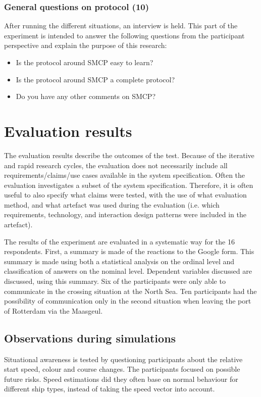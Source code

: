 \subsubsection{General questions on protocol (10)}
After running the different situations, an interview is held. This part of the experiment is intended to answer the following questions from the participant perspective and explain the purpose of this research:
\begin{spacing}{1}
	\begin{itemize}
		\item Is the protocol around \ac{SMCP} easy to learn? \protocol
		\item Is the protocol around \ac{SMCP} a complete protocol? \protocol
		\item Do you have any other comments on \ac{SMCP}? \protocol
	\end{itemize}
\end{spacing}

\section{Evaluation results}
The evaluation results describe the outcomes of the test. Because of the iterative and rapid research cycles, the evaluation does not necessarily include all requirements/claims/use cases available in the system specification. Often the evaluation investigates a subset of the system specification. Therefore, it is often useful to also specify what claims were tested, with the use of what evaluation method, and what artefact was used during the evaluation (i.e. which requirements, technology, and interaction design patterns were included in the artefact).

The results of the experiment are evaluated in a systematic way for the 16 respondents. First, a summary is made of the reactions to the Google form. This summary is made using both a statistical analysis on the ordinal level and classification of answers on the nominal level. Dependent variables discussed are discussed, using this summary. Six of the participants were only able to communicate in the crossing situation at the North Sea. Ten participants had the possibility of communication only in the second situation when leaving the port of Rotterdam via the Maasgeul.

\subsection{Observations during simulations}
Situational awareness is tested by questioning participants about the relative start speed, colour and course changes. The participants focused on possible future risks. Speed estimations did they often base on normal behaviour for different ship types, instead of taking the speed vector into account. 

